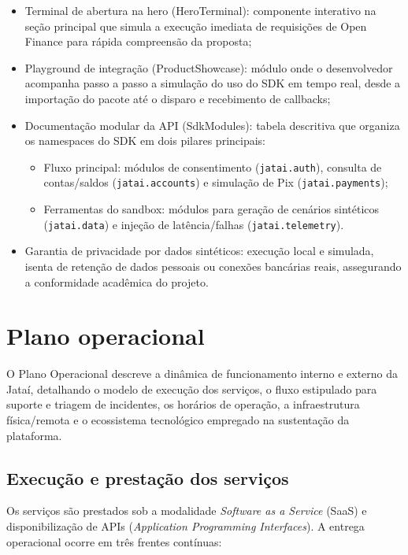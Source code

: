 \documentclass[
  12pt,
  openright,
  oneside,
  a4paper,
  brazilian
]{abntex2}
\begin{document}
\begin{itemize}
    \item{Terminal de abertura na hero (HeroTerminal):} componente interativo na seção principal que simula a execução imediata de requisições de Open Finance para rápida compreensão da proposta;
    \item{Playground de integração (ProductShowcase):} módulo onde o desenvolvedor acompanha passo a passo a simulação do uso do SDK em tempo real, desde a importação do pacote até o disparo e recebimento de callbacks;
    \item{Documentação modular da API (SdkModules):} tabela descritiva que organiza os namespaces do SDK em dois pilares principais:
    \begin{itemize}
        \item{Fluxo principal:} módulos de consentimento (\texttt{jatai.auth}), consulta de contas/saldos (\texttt{jatai.accounts}) e simulação de Pix (\texttt{jatai.payments});
        \item{Ferramentas do sandbox:} módulos para geração de cenários sintéticos (\texttt{jatai.data}) e injeção de latência/falhas (\texttt{jatai.telemetry}).
    \end{itemize}
    \item{Garantia de privacidade por dados sintéticos:} execução local e simulada, isenta de retenção de dados pessoais ou conexões bancárias reais, assegurando a conformidade acadêmica do projeto.
\end{itemize}

\chapter{Plano operacional}
\label{cap:plano_operacional}

O Plano Operacional descreve a dinâmica de funcionamento interno e externo da Jataí, detalhando o modelo de execução dos serviços, o fluxo estipulado para suporte e triagem de incidentes, os horários de operação, a infraestrutura física/remota e o ecossistema tecnológico empregado na sustentação da plataforma.

\section{Execução e prestação dos serviços}
\label{sec:execucao_servicos}

Os serviços são prestados sob a modalidade \textit{Software as a Service} (SaaS) e disponibilização de APIs (\textit{Application Programming Interfaces}). A entrega operacional ocorre em três frentes contínuas:
\end{document}
